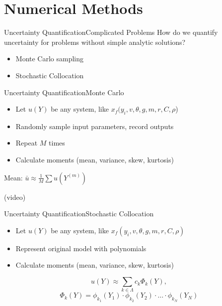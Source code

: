 \documentclass{beamer}
\begin{document}
\section{Numerical Methods}
\begin{frame}{Uncertainty Quantification}{Complicated Problems}\vspace{-20pt}
How do we quantify uncertainty for problems without simple analytic solutions?\vspace{15pt}
\begin{itemize}
\item Monte Carlo sampling
\item Stochastic Collocation
\end{itemize}
\end{frame}

\begin{frame}{Uncertainty Quantification}{Monte Carlo}\vspace{-30pt}
\begin{itemize}
\item Let $u(Y)$ be any system, like $x_f(y_i,v,\theta,g,m,r,C,\rho$)
\item Randomly sample input parameters, record outputs
\item Repeat $M$ times
\item Calculate moments (mean, variance, skew, kurtosis)
\end{itemize}
\centerline{Mean: $\bar u\approx\frac{1}{M}\sum u\left(Y^{(m)}\right)$}
(video)
\end{frame}

\begin{frame}{Uncertainty Quantification}{Stochastic Collocation}\vspace{-30pt}
\begin{itemize}
\item Let $u(Y)$ be any system, like $x_f(y_i,v,\theta,g,m,r,C,\rho)$
\item Represent original model with polynomials
\item Calculate moments (mean, variance, skew, kurtosis)
\end{itemize}
\begin{equation*}
u(Y)\approx\sum_{k\in\Lambda}c_k\Phi_k(Y),
\end{equation*}
\begin{equation*}
\Phi_k(Y) = \phi_{k_1}(Y_1)\cdot\phi_{k_2}(Y_2)\cdot\ldots\cdot\phi_{k_N}(Y_N)
\end{equation*}
\end{frame}
\end{document}
